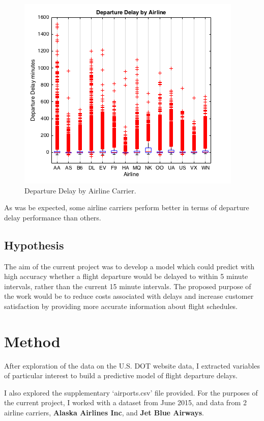 \documentclass[a4paper, 10pt]{article}
\begin{document}
\begin{figure}[H]
\begin{center}
\includegraphics[scale=0.5]{departureDelayByAirline}
\caption{Departure Delay by Airline Carrier.}
\label{departureDelayByAirline}
\end{center}
\end{figure}

As was be expected, some airline carriers perform better in terms of departure delay performance than others.



\subsection{Hypothesis}\label{hypothesis}
The aim of the current project was to develop a model which could predict with high accuracy whether a flight departure would be delayed to within 5 minute intervals, rather than the current 15 minute intervals. The proposed purpose of the work would be to reduce costs associated with delays and increase customer satisfaction by providing more accurate information about flight schedules. 

\section{Method}
After exploration of the data on the U.S. DOT website data, I extracted variables of particular interest to build a predictive model of flight departure delays.

\vspace{5mm}
I also explored the supplementary `airports.csv' file provided. For the purposes of the current project, I worked with a dataset from June 2015, and data from 2 airline carriers, \textbf{Alaska Airlines Inc}, and \textbf{Jet Blue Airways}. 
\end{document}
